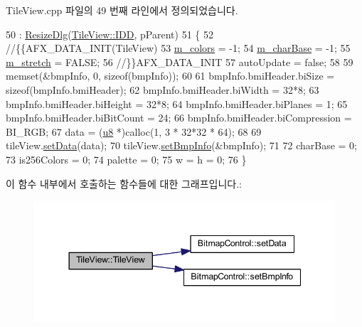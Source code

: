 Tile\+View.\+cpp 파일의 49 번째 라인에서 정의되었습니다.


\begin{DoxyCode}
50   : \mbox{\hyperlink{class_resize_dlg_a87bab778e9312f274ebe750d4c3a67ee}{ResizeDlg}}(\mbox{\hyperlink{class_tile_view_a845736b4060c250e1714163c078d1bc3a890e8d0680375a9b21dea40f16c9a8aa}{TileView::IDD}}, pParent)
51 \{
52   \textcolor{comment}{//\{\{AFX\_DATA\_INIT(TileView)}
53   \mbox{\hyperlink{class_tile_view_ad61048a17d2a93f3b8cb413d17a1533a}{m\_colors}} = -1;
54   \mbox{\hyperlink{class_tile_view_a1fd549925ae533d9ce7215b8d5de4c63}{m\_charBase}} = -1;
55   \mbox{\hyperlink{class_tile_view_a21a8f1dc56ad2e1107719d64fb206d2e}{m\_stretch}} = FALSE;
56   \textcolor{comment}{//\}\}AFX\_DATA\_INIT}
57   autoUpdate = \textcolor{keyword}{false};
58   
59   memset(&bmpInfo, 0, \textcolor{keyword}{sizeof}(bmpInfo));
60 
61   bmpInfo.bmiHeader.biSize = \textcolor{keyword}{sizeof}(bmpInfo.bmiHeader);
62   bmpInfo.bmiHeader.biWidth = 32*8;
63   bmpInfo.bmiHeader.biHeight = 32*8;
64   bmpInfo.bmiHeader.biPlanes = 1;
65   bmpInfo.bmiHeader.biBitCount = 24;
66   bmpInfo.bmiHeader.biCompression = BI\_RGB;
67   data = (\mbox{\hyperlink{_system_8h_aed742c436da53c1080638ce6ef7d13de}{u8}} *)calloc(1, 3 * 32*32 * 64);
68 
69   tileView.\mbox{\hyperlink{class_bitmap_control_aa6206183896caf192a37709fa5d7b8d2}{setData}}(data);
70   tileView.\mbox{\hyperlink{class_bitmap_control_a301c52fc62de4368fccdcdc93cefad0b}{setBmpInfo}}(&bmpInfo);
71 
72   charBase = 0;
73   is256Colors = 0;
74   palette = 0;
75   w = h = 0;
76 \}
\end{DoxyCode}
이 함수 내부에서 호출하는 함수들에 대한 그래프입니다.\+:
\nopagebreak
\begin{figure}[H]
\begin{center}
\leavevmode
\includegraphics[width=344pt]{class_tile_view_a870ab4767d06b82a3537dd5aaf7697c1_cgraph}
\end{center}
\end{figure}
\mbox{\label{class_tile_view_a8ecd586e7186c5f85e34aab4fe2a2351}} 
